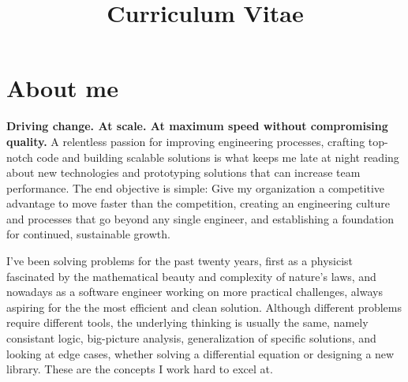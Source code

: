 \documentclass[11pt,a4paper,sans]{moderncv}        %
\title{Curriculum Vitae}                               %
\begin{document}
\makecvtitle

\section{About me}

    \textbf{Driving change. At scale. At maximum speed without compromising quality.} A relentless passion for improving engineering processes, crafting top-notch code and building scalable solutions is
    what keeps me late at night reading about new technologies and prototyping solutions that can increase team performance. The end objective is simple: Give my organization a competitive advantage to move
    faster than the competition, creating an engineering culture and processes that go beyond any single engineer, and establishing a foundation for continued, sustainable growth.



    I've been solving problems for the past twenty years, first as a physicist fascinated by the mathematical beauty and complexity of nature's laws, and nowadays as a software
    engineer working on more practical challenges, always aspiring for the the most efficient and clean solution. Although different problems require different tools, the underlying thinking
    is usually the same, namely consistant logic, big-picture analysis, generalization of specific solutions, and looking at edge cases, whether solving a
    differential equation or designing a new library. These are the concepts I work hard to excel at.
\end{document}
